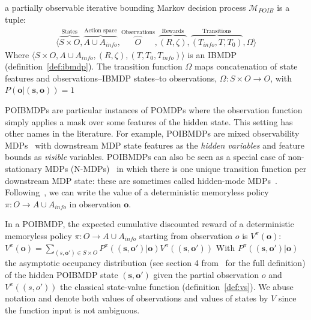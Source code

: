 \begin{definition}\label{def:poibmdp} a partially observable iterative bounding Markov decision process $\mathcal{M}_{POIB}$ is a tuple:
    \begin{align*}
        \langle \overbrace{S\times O}^{\text{States}}, \overbrace{A\cup A_{info}}^{\text{Action space}},\overbrace{O}^{\text{Observations}} ,\overbrace{(R, \zeta)}^{\text{Rewards}}, \overbrace{(T_{info}, T, T_0)}^{\text{Transitions}}, \Omega \rangle
    \end{align*}
Where $\langle S\times O, A\cup A_{info}, (R, \zeta),( T, T_0, T_{info})\rangle$ is an IBMDP (definition~\ref{def:ibmdp}).
The transition function $\Omega$ maps concatenation of state features and observations--IBMDP states--to observations, $\Omega:S\times O \rightarrow O$, with $P(\boldsymbol{o}|(\boldsymbol{s}, \boldsymbol{o}))=1$ 
\end{definition}
POIBMDPs are particular instances of POMDPs where the observation function simply applies a mask over some features of the hidden state.
This setting has other names in the literature.
For example, POIBMDPs are mixed observability MDPs~\citep{momdp} with downstream MDP state features as the \textit{hidden variables} and feature bounds as \textit{visible} variables.
POIBMDPs can also be seen as a special case of non-stationary MDPs (N-MDPs)~\citep{learning-pomdp} in which there is one unique transition function per downstream MDP state: these are sometimes called hidden-mode MDPs~\citep{hmmdp}.
Following~\cite{learning-pomdp}, we can write the value of a deterministic memoryless policy $\pi:O\rightarrow A\cup A_{info}$ in observation $\boldsymbol{o}$.

\begin{definition}\label{def:vpo} In a POIBMDP, the expected cumulative discounted reward of a deterministic memoryless policy $\pi:O\rightarrow A\cup A_{info}$ starting from observation $o$ is $V^{\pi}(\boldsymbol{o})$:
$V^{\pi}(\boldsymbol{o}) = \underset{(s,\boldsymbol{o}')\in S\times O}{\sum}P^{\pi}((\boldsymbol{s}, \boldsymbol{o}')|\boldsymbol{o})V^{\pi}((\boldsymbol{s}, \boldsymbol{o}'))$
With $P^{\pi}((\boldsymbol{s}, \boldsymbol{o}')|\boldsymbol{o})$ the asymptotic occupancy distribution (see section 4 from~\cite{learning-pomdp} for the full definition) of the hidden POIBMDP state $(\boldsymbol{s},\boldsymbol{o}')$ given the partial observation $o$ and $V^{\pi}((s, o'))$ the classical state-value function (definition~\ref{def:vs}).
We abuse notation and denote both values of observations and values of states by $V$ since the function input is not ambiguous.
\end{definition}

